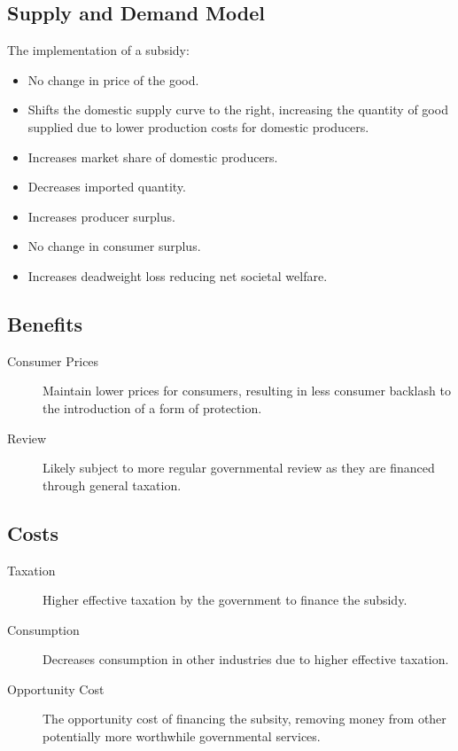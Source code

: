 \documentclass[a4paper,11pt]{article}
\begin{document}
\subsection{Supply and Demand Model}

The implementation of a subsidy:

\begin{itemize}
\item No change in price of the good.
\item Shifts the domestic supply curve to the right, increasing the quantity of
	good supplied due to lower production costs for domestic producers.
\item Increases market share of domestic producers.
\item Decreases imported quantity.
\item Increases producer surplus.
\item No change in consumer surplus.
\item Increases deadweight loss reducing net societal welfare.
\end{itemize}


\subsection{Benefits}

\begin{description}
\item [Consumer Prices] Maintain lower prices for consumers, resulting in less
	consumer backlash to the introduction of a form of protection.
\item [Review] Likely subject to more regular governmental review as they are
	financed through general taxation.
\end{description}


\subsection{Costs}

\begin{description}
\item [Taxation] Higher effective taxation by the government to finance the
	subsidy.
\item [Consumption] Decreases consumption in other industries due to higher
	effective taxation.
\item [Opportunity Cost] The opportunity cost of financing the subsity,
	removing money from other potentially more worthwhile governmental services.
\end{description}
\end{document}
